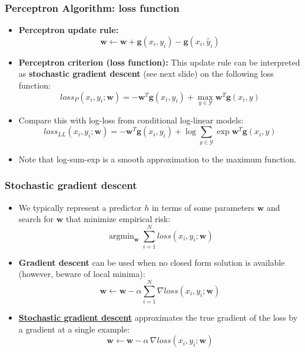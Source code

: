 \documentclass[ignorenonframetext,plain]{beamer}
\DeclareMathOperator*{\argmin}{argmin}
\newcommand{\loss}{\mathit{loss}}
\renewcommand{\vec}{\mathbf}
\begin{document}
\begin{frame}\frametitle{Perceptron Algorithm: loss function}
\begin{itemize}
\item {\bf Perceptron update rule:}
\[ \vec{w} \leftarrow \vec{w} 
+\vec{g}(x_i,y_i)
-\vec{g}(x_i,\hat{y}_i)
\]
\item {\bf Perceptron criterion (loss function):} This update rule can
  be interpreted as {\bf stochastic gradient descent} (see next slide)
  on the following loss function:
\[
\loss_P(x_i, y_i; \vec{w}) = 
-\vec{w}^T \vec{g}(x_i,y_i)
+\max_{y\in\mathcal{Y}} \vec{w}^T \vec{g}(x_i,y)
\]

\item Compare this with log-loss from conditional log-linear models: \[
\loss_{LL}(x_i, y_i; \vec{w}) = 
-\vec{w}^T \vec{g}(x_i,y_i) 
+\log \sum_{y\in\mathcal{Y}} \exp \vec{w}^T \vec{g}(x_i,y) 
\]

\item Note that log-sum-exp is a smooth approximation to the maximum
  function.
\end{itemize}
\end{frame}

\begin{frame}\frametitle{Stochastic gradient descent}
\begin{itemize}
\item We typically represent a predictor $h$ in terms of some parameters
  $\vec{w}$ and search for $\vec{w}$ that minimize empirical
  risk: \[ 
  \argmin_\vec{w} \sum_{i=1}^N \loss(x_i, y_i; \vec{w})
  \]
\item {\bf Gradient descent} can be used when no closed form solution
  is available (however, beware of local minima): \[ \vec{w} \leftarrow
  \vec{w} - \alpha \sum_{i=1}^N \nabla \loss(x_i, y_i; \vec{w})
\]
\item {\bf
  \href{http://en.wikipedia.org/wiki/Stochastic_gradient_descent}
       {Stochastic gradient descent}} approximates the true gradient 
  of the loss by a gradient at a single example: \[ \vec{w}
  \leftarrow \vec{w} - \alpha\, \nabla \loss(x_i, y_i; \vec{w})
\]
\end{itemize}
\end{frame}
\end{document}
